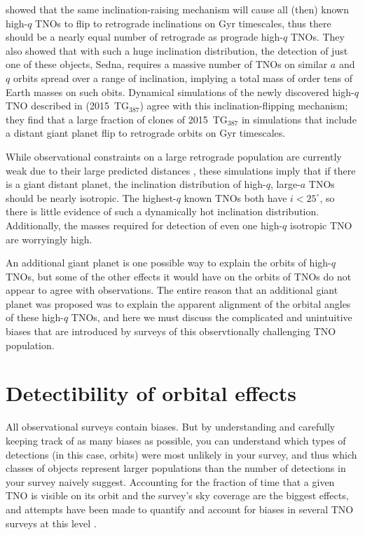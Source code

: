 \documentclass[preprint]{aastex62}
\begin{document}
\citet{shankman17} showed that the same inclination-raising mechanism will cause all (then) known high-$q$ TNOs to flip to retrograde inclinations on Gyr timescales, thus there should be a nearly equal number of retrograde as prograde high-$q$ TNOs.
They also showed that with such a huge inclination distribution, the detection of just one of these objects, Sedna, requires a massive number of TNOs on similar $a$ and $q$ orbits spread over a range of inclination, implying a total mass of order tens of Earth masses on such obits.
Dynamical simulations of the newly discovered high-$q$ TNO described in \citet{sheppard18} (2015~TG$_{387}$) agree with this inclination-flipping mechanism; they find that a large fraction of clones of 2015~TG$_{387}$ in simulations that include a distant giant planet flip to retrograde orbits on Gyr timescales.

While observational constraints on a large retrograde population are currently weak due to their large predicted distances \citep{lawler2017}, these simulations imply that if there is a giant distant planet, the inclination distribution of high-$q$, large-$a$ TNOs should be nearly isotropic.
The highest-$q$ known TNOs both have $i<25^{\circ}$, so there is little evidence of such a dynamically hot inclination distribution.
Additionally, the masses required for detection of even one high-$q$ isotropic TNO are worryingly high. 

An additional giant planet is one possible way to explain the orbits of high-$q$ TNOs, but some of the other effects it would have on the orbits of TNOs do not appear to agree with observations.
The entire reason that an additional giant planet was proposed was to explain the apparent alignment of the orbital angles of these high-$q$ TNOs, and here we must discuss the complicated and unintuitive biases that are introduced by surveys of this observtionally challenging TNO population.

\section{Detectibility of orbital effects}


All observational surveys contain biases.
But by understanding and carefully keeping track of as many biases as possible, you can understand which types of detections (in this case, orbits) were most unlikely in your survey, and thus which classes of objects represent larger populations than the number of detections in your survey naively suggest.
Accounting for the fraction of time that a given TNO is visible on its orbit and the survey's sky coverage are the biggest effects, and attempts have been made to quantify and account for biases in several TNO surveys at this level
\citep[e.g.][]{schwambetal10,adams14}.
\end{document}
